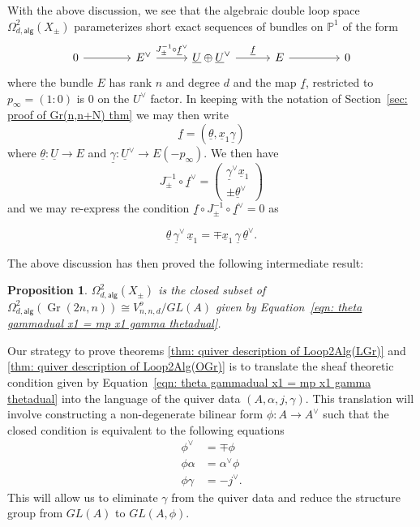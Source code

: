 \documentclass{amsart}
\newtheorem{proposition}[theorem]{Proposition}
\theoremstyle{definition}
\newcommand{\PP}{\mathbb{P}}
\newcommand{\UL}[1]{\underline{#1}}
\newcommand{\alg}{\mathsf{alg}}
\newcommand{\Gr}{\operatorname{Gr}}
\newcommand{\LoopTwo}{\Omega^{2}_{d,\alg}}
\newcommand{\Xpm}{X_{\pm}}
\begin{document}
With the above discussion, we see that the algebraic double loop space
$\LoopTwo(\Xpm )$ parameterizes short exact sequences of
bundles on $\PP^{1}$ of the form
\begin{equation}\label{eqn: Evee-->U+Uvee-->E}
\begin{tikzcd}[column sep={6em,between origins}]
0 \arrow[r] &
E^{\vee } \arrow[r, "J_{\pm }^{-1}\circ \UL{f}^{\vee}"] &
\UL{U}\oplus \UL{U}^{\vee } \arrow[r, "\UL{f}"] &
E \arrow[r] &
0
\end{tikzcd}
\end{equation}
where the bundle $E$ has rank $n$ and degree $d$ and the map $\UL{f}$,
restricted to $p_{\infty} = (1:0)$ is 0 on the $U^{\vee}$ factor. In
keeping with the notation of Section~\ref{sec: proof of Gr(n,n+N) thm}
we may then write
\[
\UL{f} = (\UL{\theta},\UL{x}_{1}\UL{\gamma})
\]
where $\UL{\theta}:\UL{U}\to E$ and $\UL{\gamma}:\UL{U}^{\vee}\to
E(-p_{\infty}).$ We then have
\[
J_{\pm}^{-1}\circ \UL{f}^{\vee} = \begin{pmatrix} \UL{\gamma}^{\vee}\UL{x}_{1} \\
\pm \UL{\theta}^{\vee}  \end{pmatrix}
\]
and we may re-express the condition $\UL{f}\circ J_{\pm}^{-1}\circ
\UL{f}^{\vee}=0$ as

\begin{equation}\label{eqn: theta gammadual x1 = mp x1 gamma thetadual}
\UL{\theta}\, \UL{\gamma}^{\vee}\, \UL{x}_{1} =  \mp \UL{x}_{1}\, 
\UL{\gamma}\,  \UL{\theta}^{\vee }.
\end{equation}

The above discussion has then proved the following intermediate result:

\begin{proposition}\label{prop: Loop2(Xpm) is a closed set in
Loop(Gr(n,2n)) satisfying condition involving theta and gamma}
$\LoopTwo (\Xpm )$ is the closed subset of $\LoopTwo (\Gr(2n,n))\cong
V^{o}_{n,n,d}/GL(A)$ given by Equation~\eqref{eqn: theta gammadual x1
= mp x1 gamma thetadual}. 
\end{proposition}

Our strategy to prove theorems \ref{thm: quiver description of
Loop2Alg(LGr)} and \ref{thm: quiver description of Loop2Alg(OGr)} is
to translate the sheaf theoretic condition given by
Equation~\eqref{eqn: theta gammadual x1 = mp x1 gamma thetadual} into
the language of the quiver data $(A,\alpha ,j,\gamma )$. This
translation will involve constructing a non-degenerate bilinear form
$\phi :A\to A^{\vee}$ such that the closed condition is equivalent to
the following equations
\begin{align}\label{eqns: closed conditions}
\phi^{\vee}&= \mp \phi \nonumber \\ 
\phi \alpha &=\alpha^{\vee}\phi \\
\phi \gamma &= - j^{\vee}. \nonumber 
\end{align}
This will allow us to eliminate $\gamma$ from the quiver data and
reduce the structure group from $GL(A)$ to $GL(A,\phi )$.
\end{document}

